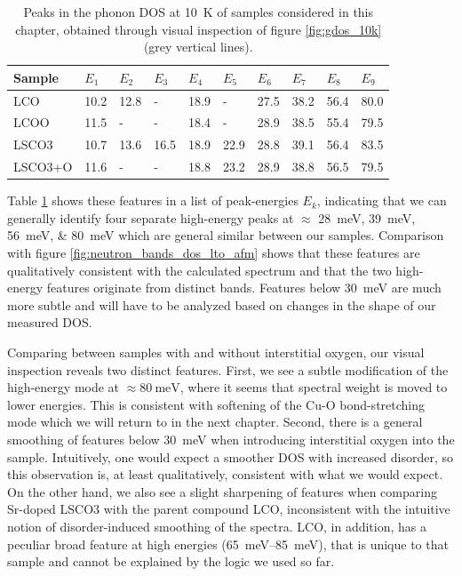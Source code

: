 \begin{table}
    \caption{Peaks in the phonon DOS at \SI{10}{\kelvin} of samples considered in this chapter, obtained through visual inspection of figure \ref{fig:gdos_10k} (grey vertical lines).}
    \label{tab:gdos_features_10K}
    \centering
    \begin{tabular}{llllllllll}
        \toprule
          Sample &  $E_1$ & $E_2$ & $E_3$ &  $E_4$ & $E_5$ &  $E_6$ &  $E_7$ &  $E_8$ &  $E_9$ \\
        \midrule
             LCO &   10.2 &  12.8 &     - &   18.9 &     - &   27.5 &   38.2 &   56.4 &   80.0 \\
            LCOO &   11.5 &     - &     - &   18.4 &     - &   28.9 &   38.5 &   55.4 &   79.5 \\
           LSCO3 &   10.7 &  13.6 &  16.5 &   18.9 &  22.9 &   28.8 &   39.1 &   56.4 &   83.5 \\
         LSCO3+O &   11.6 &     - &     - &   18.8 &  23.2 &   28.9 &   38.8 &   56.5 &   79.5 \\
        \bottomrule
    \end{tabular}
\end{table}

Table \ref{tab:gdos_features_10K} shows these features in a list of peak-energies $E_k$, indicating that we can generally identify four separate high-energy peaks at $\approx$ \SIlist{28;39;56;80}{\milli\eV} which are general similar between our samples. Comparison with figure \ref{fig:neutron_bands_dos_lto_afm} shows that these features are qualitatively consistent with the calculated spectrum and that the two high-energy features originate from distinct bands. Features below \SI{30}{\milli\eV} are much more subtle and will have to be analyzed based on changes in the shape of our measured DOS.

Comparing between samples with and without interstitial oxygen, our visual inspection reveals two distinct features. First, we see a subtle modification of the high-energy mode at $\approx \SI{80}{\milli\eV}$, where it seems that spectral weight is moved to lower energies. This is consistent with softening of the Cu-O bond-stretching mode which we will return to in the next chapter. Second, there is a general smoothing of features below \SI{30}{\milli\eV} when introducing interstitial oxygen into the sample. Intuitively, one would expect a smoother DOS with increased disorder, so this observation is, at least qualitatively, consistent with what we would expect. On the other hand, we also see a slight sharpening of features when comparing Sr-doped LSCO3 with the parent compound LCO, inconsistent with the intuitive notion of disorder-induced smoothing of the spectra. LCO, in addition, has a peculiar broad feature at high energies (\SIrange{65}{85}{\milli\eV}), that is unique to that sample and cannot be explained by the logic we used so far.

